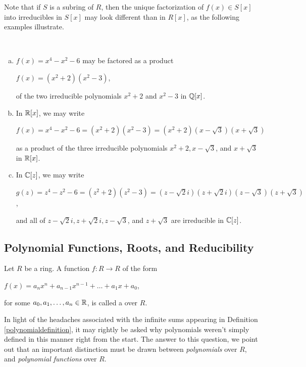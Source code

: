 \documentclass[11pt,fleqn,dvipsnames,usenames]{article}
\newcommand{\p}{\noindent}
\begin{document}
\vsp

%
\p Note that if $S$ is a subring of $R$, then the unique factorization of $f(x)\in S[x]$ into irreducibles in $S[x]$ may look different than in $R[x]$, as the following examples illustrate.
\vsp

\begin{examples}~
\begin{enumerate}[(a)]
\item $f(x) = x^4 - x^2 - 6$ may be factored as a product
\begin{center}
$f(x) = (x^2 + 2)(x^2 - 3)$,
\end{center}
of the two irreducible polynomials $x^2 + 2$ and $x^2 - 3$ in $\mathbb{Q}[x]$.
\item In $\mathbb{R}[x]$, we may write
\begin{center}
$f(x) = x^4 - x^2 - 6 = (x^2 + 2)(x^2 - 3) = (x^2 + 2)(x - \sqrt{3})(x + \sqrt{3})$
\end{center}
as a product of the three irreducible polynomials $x^2 + 2, x - \sqrt{3}$, and $x+\sqrt{3}$ in $\mathbb{R}[x]$.
\item In $\mathbb{C}[z]$, we may write
\begin{center}
$g(z) = z^4 - z^2 - 6 = (z^2 + 2)(z^2 - 3) = (z-\sqrt{2}i)(z + \sqrt{2}i)(z - \sqrt{3})(z + \sqrt{3})$,
\end{center}
and all of $z-\sqrt{2}i, z + \sqrt{2}i, z - \sqrt{3}$, and $z + \sqrt{3}$ are irreducible in $\mathbb{C}[z]$.
\end{enumerate}
\end{examples}
\newpage

%
\subsection{Polynomial Functions, Roots, and Reducibility}
\begin{definition}
Let $R$ be a ring.  A function $f:R\to R$ of the form
\begin{center}
$f(x) = a_{n}x^n + a_{n-1}x^{n-1} + \ldots + a_{1}x + a_{0}$,
\end{center}
for some $a_{0},a_{1},\ldots, a_{n}\in\mathbb{R}$, is called a  over $R$.
\end{definition}
\p In light of the headaches associated with the infinite sums appearing in Definition \ref{polynomialdefinition}, it may rightly be asked why polynomials weren't simply defined in this manner right from the start.  The answer to this question, we point out that an important distinction must be drawn between \emph{polynomials} over $R$, and \emph{polynomial functions} over $R$.
\vsp
\end{document}
